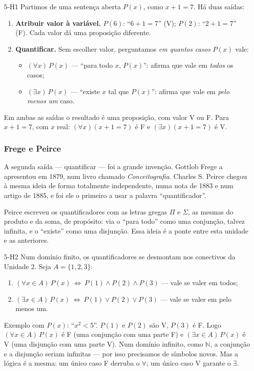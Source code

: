 \begin{construcao}{5-H1}
Partimos de uma sentença aberta $P(x)$, como $x+1=7$. Há duas saídas:
\begin{enumerate}[label=(\arabic*)]
  \item \textbf{Atribuir valor à variável.} $P(6)$: \enquote{$6+1=7$} (V); $P(2)$: \enquote{$2+1=7$} (F). Cada valor dá uma proposição diferente.
  \item \textbf{Quantificar.} Sem escolher valor, perguntamos \emph{em quantos casos} $P(x)$ vale:
  \begin{itemize}
    \item $(\forall x)\,P(x)$ — \enquote{para todo $x$, $P(x)$}: afirma que vale em \emph{todos} os casos;
    \item $(\exists x)\,P(x)$ — \enquote{existe $x$ tal que $P(x)$}: afirma que vale em \emph{pelo menos um} caso.
  \end{itemize}
\end{enumerate}
Em ambas as saídas o resultado é uma proposição, com valor V ou F. Para $x+1=7$, com $x$ real: $(\forall x)(x+1=7)$ é F e $(\exists x)(x+1=7)$ é V.
\end{construcao}

\subsubsection{Frege e Peirce}
A segunda saída — quantificar — foi a grande invenção. Gottlob Frege a apresentou em 1879, num livro chamado \emph{Conceitografia}. Charles S. Peirce chegou à mesma ideia de forma totalmente independente, numa nota de 1883 e num artigo de 1885, e foi ele o primeiro a usar a palavra \enquote{quantificador}.

Peirce escreveu os quantificadores com as letras gregas $\Pi$ e $\Sigma$, as mesmas do produto e da soma, de propósito: via o \enquote{para todo} como uma conjunção, talvez infinita, e o \enquote{existe} como uma disjunção. Essa ideia é a ponte entre esta unidade e as anteriores.

\begin{construcao}{5-H2}
Num domínio finito, os quantificadores se desmontam nos conectivos da Unidade 2. Seja $A=\{1,2,3\}$:
\begin{enumerate}[label=(\arabic*)]
  \item $(\forall x\in A)\,P(x)\ \Leftrightarrow\ P(1)\wedge P(2)\wedge P(3)$ — vale se valer em todos;
  \item $(\exists x\in A)\,P(x)\ \Leftrightarrow\ P(1)\vee P(2)\vee P(3)$ — vale se valer em pelo menos um.
\end{enumerate}
Exemplo com $P(x)$: \enquote{$x^2<5$}. $P(1)$ e $P(2)$ são V, $P(3)$ é F. Logo $(\forall x\in A)\,P(x)$ é F (uma conjunção com uma parte F) e $(\exists x\in A)\,P(x)$ é V (uma disjunção com uma parte V).
Num domínio infinito, como $\mathbb{N}$, a conjunção e a disjunção seriam infinitas — por isso precisamos de símbolos novos. Mas a lógica é a mesma: um único caso F derruba o $\forall$; um único caso V garante o $\exists$.
\end{construcao}

